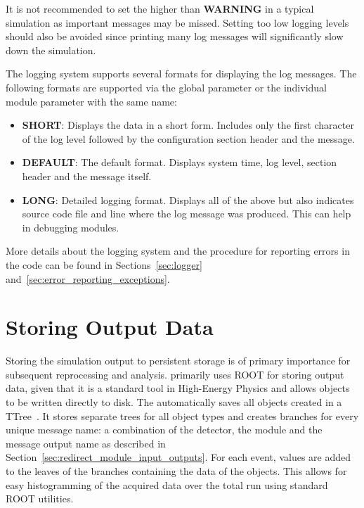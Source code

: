 \begin{warning}
    It is not recommended to set the  higher than \textbf{WARNING} in a typical simulation as important messages may be missed.
    Setting too low logging levels should also be avoided since printing many log messages will significantly slow down the simulation.
\end{warning}

The logging system supports several formats for displaying the log messages.
The following formats are supported via the global parameter  or the individual module parameter with the same name:
\begin{itemize}
\item \textbf{SHORT}: Displays the data in a short form.
Includes only the first character of the log level followed by the configuration section header and the message.
\item \textbf{DEFAULT}: The default format.
Displays system time, log level, section header and the message itself.
\item \textbf{LONG}: Detailed logging format.
Displays all of the above but also indicates source code file and line where the log message was produced.
This can help in debugging modules.
\end{itemize}

More details about the logging system and the procedure for reporting errors in the code can be found in Sections~\ref{sec:logger} and~\ref{sec:error_reporting_exceptions}.

\section{Storing Output Data}
\label{sec:storing_output_data}
Storing the simulation output to persistent storage is of primary importance for subsequent reprocessing and analysis.
\apsq primarily uses ROOT for storing output data, given that it is a standard tool in High-Energy Physics and allows objects to be written directly to disk.
The  automatically saves all objects created in a TTree~\cite{roottree}.
It stores separate trees for all object types and creates branches for every unique message name: a combination of the detector, the module and the message output name as described in Section~\ref{sec:redirect_module_input_outputs}.
For each event, values are added to the leaves of the branches containing the data of the objects.
This allows for easy histogramming of the acquired data over the total run using standard ROOT utilities.

